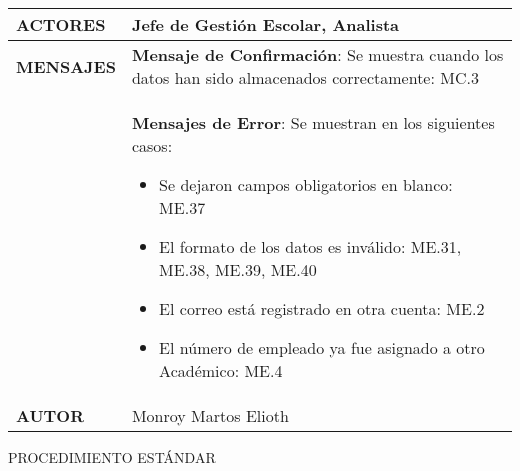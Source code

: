 \begin{longtable}{ | p{6cm} | p{10cm} |}
    \hline
    \textbf{ACTORES} & Jefe de Gestión Escolar, Analista\\
    \hline
    \textbf{MENSAJES}  & \textbf{Mensaje de Confirmación}: Se muestra cuando los datos han sido almacenados correctamente: MC.3\\&\textbf{Mensajes de Error}: Se muestran en los siguientes casos:\begin{itemize}
    	\item Se dejaron campos obligatorios en blanco: ME.37
    	\item El formato de los datos es inválido: ME.31, ME.38, ME.39, ME.40
    	\item El correo está registrado en otra cuenta: ME.2
    	\item El número de empleado ya fue asignado a otro Académico: ME.4
    \end{itemize}\\
    \hline
    \textbf{AUTOR} & Monroy Martos Elioth\\
    \hline
\end{longtable}
\vspace*{1cm}
\noindent
\Large{PROCEDIMIENTO ESTÁNDAR}
\large{}
